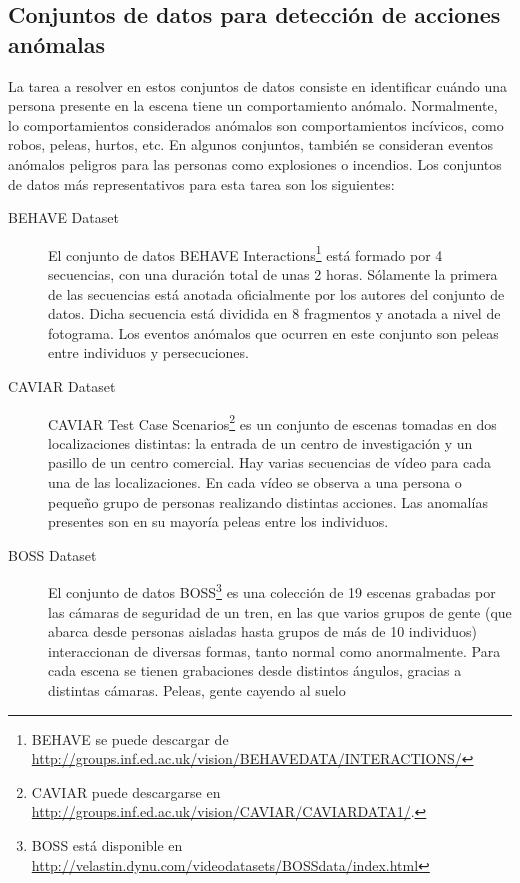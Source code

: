 \documentclass[../main.tex]{memoir}
\begin{document}
\subsection{Conjuntos de datos para detección de acciones anómalas}
\label{sec:action-anomaly-datasets}

La tarea a resolver en estos conjuntos de datos consiste en
identificar cuándo una persona presente en la escena tiene un
comportamiento anómalo. Normalmente, lo comportamientos considerados
anómalos son comportamientos incívicos, como robos, peleas, hurtos,
etc. En algunos conjuntos, también se consideran eventos anómalos
peligros para las personas como explosiones o incendios. Los conjuntos
de datos más representativos para esta tarea son los siguientes:

\begin{description}
\item[BEHAVE Dataset] El conjunto de datos BEHAVE
  Interactions\footnote{BEHAVE se puede descargar de
    \url{http://groups.inf.ed.ac.uk/vision/BEHAVEDATA/INTERACTIONS/}}
  \cite{blunsden2010behave} está formado por 4 secuencias, con una
  duración total de unas 2 horas. Sólamente la primera de las
  secuencias está anotada oficialmente por los autores del conjunto de
  datos. Dicha secuencia está dividida en 8 fragmentos y anotada a
  nivel de fotograma. Los eventos anómalos que ocurren en este
  conjunto son peleas entre individuos y persecuciones.
\item[CAVIAR Dataset] CAVIAR Test Case Scenarios\footnote{CAVIAR puede
    descargarse en
    \url{http://groups.inf.ed.ac.uk/vision/CAVIAR/CAVIARDATA1/}.} es
  un conjunto de escenas tomadas en dos localizaciones distintas: la
  entrada de un centro de investigación y un pasillo de un centro
  comercial. Hay varias secuencias de vídeo para cada una de las
  localizaciones. En cada vídeo se observa a una persona o pequeño
  grupo de personas realizando distintas acciones. Las anomalías
  presentes son en su mayoría peleas entre los individuos.
\item[BOSS Dataset] El conjunto de datos BOSS\footnote{BOSS está
    disponible en
    \url{http://velastin.dynu.com/videodatasets/BOSSdata/index.html}}
  \cite{velastin2017people} es una colección de 19 escenas grabadas
  por las cámaras de seguridad de un tren, en las que varios grupos de
  gente (que abarca desde personas aisladas hasta grupos de más de 10
  individuos) interaccionan de diversas formas, tanto normal como
  anormalmente. Para cada escena se tienen grabaciones desde distintos
  ángulos, gracias a distintas cámaras. Peleas, gente cayendo al suelo

\end{description}
\end{document}
